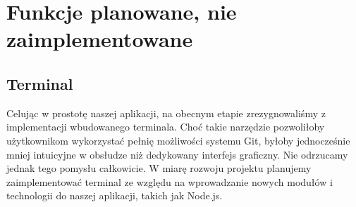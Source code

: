 \section{Funkcje planowane, nie zaimplementowane}
\subsection{Terminal}
Celując w prostotę naszej aplikacji, na obecnym etapie zrezygnowaliśmy z implementacji wbudowanego terminala. Choć takie narzędzie pozwoliłoby użytkownikom wykorzystać pełnię możliwości systemu Git, byłoby jednocześnie mniej intuicyjne w obsłudze niż dedykowany interfejs graficzny. Nie odrzucamy jednak tego pomysłu całkowicie. W miarę rozwoju projektu planujemy zaimplementować terminal ze względu na wprowadzanie nowych modułów i technologii do naszej aplikacji, takich jak Node.js.